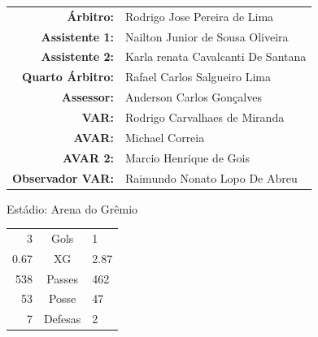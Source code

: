 \documentclass[11pt]{article}
\begin{document}
\vspace{0.5cm}
\begin{minipage}{0.65\textwidth}
\begin{center}
\begin{tabular}{rl}
\textbf{Árbitro:} & Rodrigo Jose Pereira de Lima \\
\textbf{Assistente 1:} & Nailton Junior de Sousa Oliveira \\
\textbf{Assistente 2:} & Karla renata Cavalcanti De Santana \\
\textbf{Quarto Árbitro:} & Rafael Carlos Salgueiro Lima \\
\textbf{Assessor:} & Anderson Carlos Gonçalves \\
\textbf{VAR:} & Rodrigo Carvalhaes de Miranda \\
\textbf{AVAR:} & Michael Correia \\
\textbf{AVAR 2:} & Marcio Henrique de Gois \\
\textbf{Observador VAR:} & Raimundo Nonato Lopo De Abreu \\
\end{tabular}
\end{center}
\end{minipage}
\begin{minipage}{0.3\textwidth}
Estádio: Arena do Grêmio\\
\begin{tabular}{rcl}
3 & Gols & 1 \\
0.67 & XG & 2.87 \\
538 & Passes & 462 \\
53 & Posse & 47 \\
7 & Defesas & 2 \\
\end{tabular}
\end{minipage}
\newpage
\end{document}
